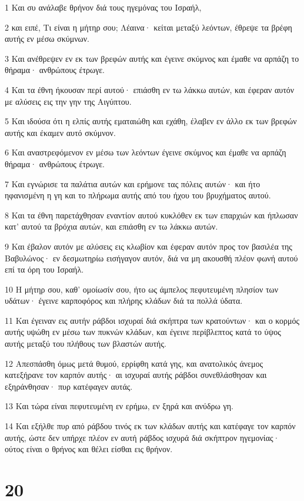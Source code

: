 \par 1 Και συ ανάλαβε θρήνον διά τους ηγεμόνας του Ισραήλ,
\par 2 και ειπέ, Τι είναι η μήτηρ σου; Λέαινα· κείται μεταξύ λεόντων, έθρεψε τα βρέφη αυτής εν μέσω σκύμνων.
\par 3 Και ανέθρεψεν εν εκ των βρεφών αυτής και έγεινε σκύμνος και έμαθε να αρπάζη το θήραμα· ανθρώπους έτρωγε.
\par 4 Και τα έθνη ήκουσαν περί αυτού· επιάσθη εν τω λάκκω αυτών, και έφεραν αυτόν με αλύσεις εις την γην της Αιγύπτου.
\par 5 Και ιδούσα ότι η ελπίς αυτής εματαιώθη και εχάθη, έλαβεν εν άλλο εκ των βρεφών αυτής και έκαμεν αυτό σκύμνον.
\par 6 Και αναστρεφόμενον εν μέσω των λεόντων έγεινε σκύμνος και έμαθε να αρπάζη θήραμα· ανθρώπους έτρωγε.
\par 7 Και εγνώρισε τα παλάτια αυτών και ερήμονε τας πόλεις αυτών· και ήτο ηφανισμένη η γη και το πλήρωμα αυτής από του ήχου του βρυχήματος αυτού.
\par 8 Και τα έθνη παρετάχθησαν εναντίον αυτού κυκλόθεν εκ των επαρχιών και ήπλωσαν κατ' αυτού τα βρόχια αυτών, και επιάσθη εν τω λάκκω αυτών.
\par 9 Και έβαλον αυτόν με αλύσεις εις κλωβίον και έφεραν αυτόν προς τον βασιλέα της Βαβυλώνος· εν δεσμωτηρίω εισήγαγον αυτόν, διά να μη ακουσθή πλέον φωνή αυτού επί τα όρη του Ισραήλ.
\par 10 Η μήτηρ σου, καθ' ομοίωσίν σου, ήτο ως άμπελος πεφυτευμένη πλησίον των υδάτων· έγεινε καρποφόρος και πλήρης κλάδων διά τα πολλά ύδατα.
\par 11 Και έγειναν εις αυτήν ράβδοι ισχυραί διά σκήπτρα των κρατούντων· και ο κορμός αυτής υψώθη εν μέσω των πυκνών κλάδων, και έγεινε περίβλεπτος κατά το ύψος αυτής μεταξύ του πλήθους των βλαστών αυτής.
\par 12 Απεσπάσθη όμως μετά θυμού, ερρίφθη κατά γης, και ανατολικός άνεμος κατεξήρανε τον καρπόν αυτής· αι ισχυραί αυτής ράβδοι συνεθλάσθησαν και εξηράνθησαν· πυρ κατέφαγεν αυτάς.
\par 13 Και τώρα είναι πεφυτευμένη εν ερήμω, εν ξηρά και ανύδρω γη.
\par 14 Και εξήλθε πυρ από ράβδου τινός εκ των κλάδων αυτής και κατέφαγε τον καρπόν αυτής, ώστε δεν υπήρχε πλέον εν αυτή ράβδος ισχυρά διά σκήπτρον ηγεμονίας· ούτος είναι ο θρήνος και θέλει είσθαι εις θρήνον.

\chapter{20}

